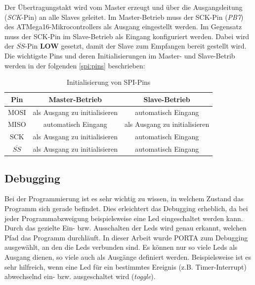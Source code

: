 Der Übertragungstakt wird vom Master erzeugt und über die Ausgangsleitung (\textit{SCK}-Pin) an alle Slaves geleitet. Im Master-Betrieb muss der SCK-Pin (\textit{PB7}) des ATMega16-Mikrocontrollers als Ausgang eingestellt werden. Im Gegensatz muss der SCK-Pin im Slave-Betrieb als Eingang konfiguriert werden. Dabei wird der $\overline{SS}$-Pin \textbf{LOW} gesetzt, damit der Slave zum Empfangen bereit gestellt wird. Die wichtigste Pins und deren Initialisierungen im Master- und Slave-Betrib werden in der folgenden \autoref{spi:pins} beschrieben: \smallskip \smallskip

\begin{table}[htbp]
	\centering
	\begin{tabular}{ |c|c|c| } \hline
		Pin & Master-Betrieb & Slave-Betrieb \\ \hline \hline
		MOSI & als Ausgang zu initialisieren & automatisch Eingang \\ \hline
		MISO & automatisch Eingang & als Ausgang zu initialisieren \\ \hline
		SCK & als Ausgang zu initialisieren & automatisch Eingang \\ \hline
		$\overline{SS}$ & als Ausgang zu initialisieren & automatisch Eingang \\ \hline
	\end{tabular}
	\caption{Initialisierung von SPI-Pins}\label{spi:pins}
\end{table}

\subsection{Debugging}

Bei der Programmierung ist es sehr wichtig zu wissen, in welchem Zustand das Programm sich gerade befindet. Dies erleichtert das Debugging erheblich, da bei jeder Programmabzweigung beispielsweise eine Led eingeschaltet werden kann. Durch das gezielte Ein- bzw. Ausschalten der Leds wird genau erkannt, welchen Pfad das Programm durchläuft. In dieser Arbeit wurde PORTA zum Debugging ausgewählt, an den die Leds verbunden sind. Es können nur so viele Leds als Ausgang dienen, so viele auch als Ausgänge definiert werden. Beispielsweise ist es sehr hilfreich, wenn eine Led für ein bestimmtes Ereignis (z.B. Timer-Interrupt) abwechselnd ein- bzw. ausgeschaltet wird (\textit{toggle}). 

